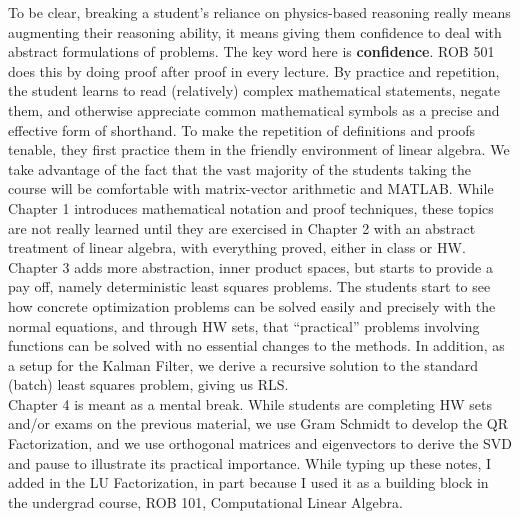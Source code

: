 To be clear, breaking a student's reliance on physics-based reasoning really means augmenting their reasoning ability, it means giving them confidence to deal with abstract formulations of problems. The key word here is \textbf{confidence}. ROB 501 does this by doing proof after proof in every lecture. By practice and repetition, the student learns to read (relatively) complex mathematical statements, negate them, and otherwise appreciate common mathematical symbols as a precise and effective form of shorthand. To make the repetition of definitions and proofs tenable, they first practice them in the friendly environment of linear algebra. We take advantage of the fact that the vast majority of the students taking the course will be comfortable with matrix-vector arithmetic and MATLAB. While Chapter 1 introduces mathematical notation and proof techniques, these topics are not really learned until they are exercised in Chapter 2 with an abstract treatment of linear algebra, with everything proved, either in class or HW. Chapter 3 adds more abstraction, inner product spaces, but starts to provide a pay off, namely deterministic least squares problems. The students start to see how concrete optimization problems can be solved easily and precisely with the normal equations, and through HW sets, that ``practical'' problems involving functions can be solved with no essential changes to the methods. In addition, as a setup for the Kalman Filter, we derive a recursive solution to the standard (batch) least squares problem, giving us RLS.\\

Chapter 4 is meant as a mental break. While students are completing HW sets and/or exams on the previous material, we use Gram Schmidt to develop the QR Factorization, and we use orthogonal matrices and eigenvectors to derive the SVD and pause to illustrate its practical importance. While typing up these notes, I added in the LU Factorization, in part because I used it as a building block in the undergrad course, ROB 101, Computational Linear Algebra. \\


